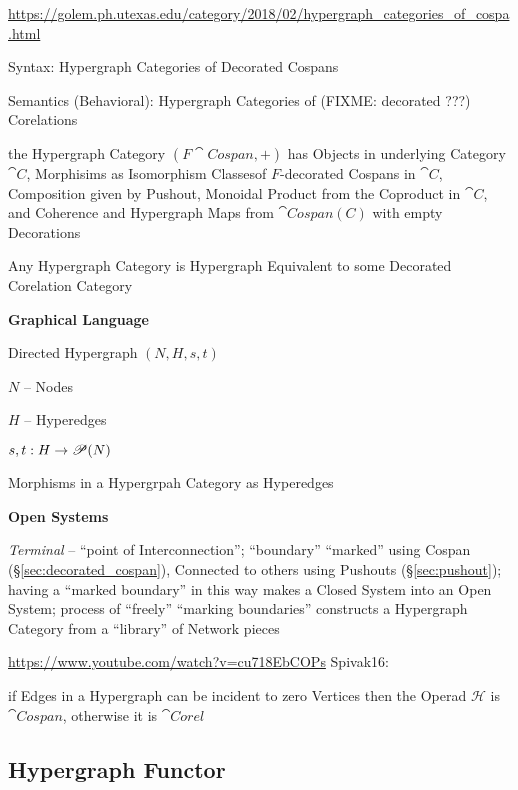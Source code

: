 \url{https://golem.ph.utexas.edu/category/2018/02/hypergraph_categories_of_cospa.html}

Syntax: Hypergraph Categories of Decorated Cospans

Semantics (Behavioral): Hypergraph Categories of (FIXME: decorated ???)
Corelations

the Hypergraph Category $(F\cat{Cospan},+)$ has Objects in underlying Category
$\cat{C}$, Morphisims as Isomorphism Classesof $F$-decorated Cospans in
$\cat{C}$, Composition given by Pushout, Monoidal Product from the Coproduct in
$\cat{C}$, and Coherence and Hypergraph Maps from $\cat{Cospan(C)}$ with empty
Decorations

Any Hypergraph Category is Hypergraph Equivalent to some Decorated Corelation
Category


\textbf{Graphical Language}

Directed Hypergraph $(N,H,s,t)$

$N$ -- Nodes

$H$ -- Hyperedges

$s,t : H \rightarrow \mathscr{P}(N)$

Morphisms in a Hypergrpah Category as Hyperedges


\textbf{Open Systems}

\emph{Terminal} -- ``point of Interconnection''; ``boundary''
``marked'' using Cospan (\S\ref{sec:decorated_cospan}), Connected to
others using Pushouts (\S\ref{sec:pushout}); having a ``marked
boundary'' in this way makes a Closed System into an Open System;
process of ``freely'' ``marking boundaries'' constructs a Hypergraph
Category from a ``library'' of Network pieces


\asterism

\url{https://www.youtube.com/watch?v=cu718EbCOPs} Spivak16:

if Edges in a Hypergraph can be incident to zero Vertices then the
Operad $\mathcal{H}$ is $\cat{Cospan}$, otherwise it is $\cat{Corel}$




\subsection{Hypergraph Functor}\label{sec:hypergraph_functor}

